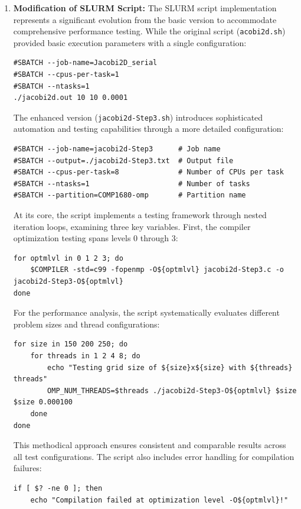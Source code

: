 \documentclass{article}
\begin{document}
\begin{enumerate}
    \item \textbf{Modification of SLURM Script:}
    The SLURM script implementation represents a significant evolution from the basic version to accommodate comprehensive performance testing. While the original script (\texttt{acobi2d.sh}) provided basic execution parameters with a single configuration:
\begin{lstlisting}[style=BashStyle, caption={Basic provided SLURM Script}]
#SBATCH --job-name=Jacobi2D_serial
#SBATCH --cpus-per-task=1
#SBATCH --ntasks=1
./jacobi2d.out 10 10 0.0001
\end{lstlisting}
    The enhanced version (\texttt{jacobi2d-Step3.sh}) introduces sophisticated automation and testing capabilities through a more detailed configuration:
\begin{lstlisting}[style=BashStyle, caption={Enhanced SLURM Script}]
#SBATCH --job-name=jacobi2d-Step3      # Job name
#SBATCH --output=./jacobi2d-Step3.txt  # Output file
#SBATCH --cpus-per-task=8              # Number of CPUs per task
#SBATCH --ntasks=1                     # Number of tasks
#SBATCH --partition=COMP1680-omp       # Partition name
\end{lstlisting}
    At its core, the script implements a testing framework through nested iteration loops, examining three key variables. First, the compiler optimization testing spans levels $0$ through $3$:
\begin{lstlisting}[style=BashStyle, caption={Compiler Optimization Testing}]
for optmlvl in 0 1 2 3; do
    $COMPILER -std=c99 -fopenmp -O${optmlvl} jacobi2d-Step3.c -o jacobi2d-Step3-O${optmlvl}
done
\end{lstlisting}
    For the performance analysis, the script systematically evaluates different problem sizes and thread configurations:
\begin{lstlisting}[style=BashStyle, caption={Performance Analysis}]
for size in 150 200 250; do
    for threads in 1 2 4 8; do
        echo "Testing grid size of ${size}x${size} with ${threads} threads"
        OMP_NUM_THREADS=$threads ./jacobi2d-Step3-O${optmlvl} $size $size 0.000100
    done
done
\end{lstlisting}
    This methodical approach ensures consistent and comparable results across all test configurations. The script also includes error handling for compilation failures:
\begin{lstlisting}[style=BashStyle, caption={Error Handling}]
if [ $? -ne 0 ]; then
    echo "Compilation failed at optimization level -O${optmlvl}!"

\end{lstlisting}
\end{enumerate}
\end{document}
